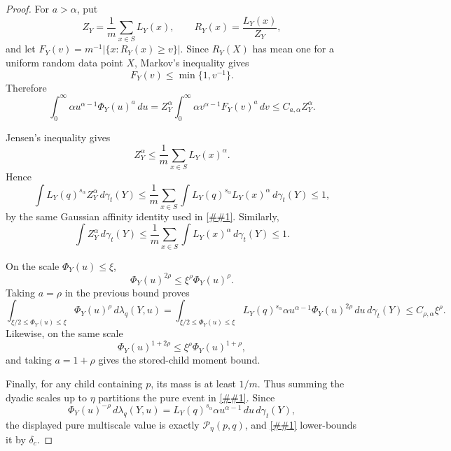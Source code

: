 \documentclass[10pt]{article}
\newcommand{\cref}[1]{\ref{##1}}
\theoremstyle{definition}
\begin{document}
\begin{proof}
   For $a>\alpha$, put
   \[
      Z_Y=\frac1m\sum_{x\in S}L_Y(x),
      \qquad
      R_Y(x)=\frac{L_Y(x)}{Z_Y},
   \]
   and let $F_Y(v)=m^{-1}|\{x:R_Y(x)\ge v\}|$. Since $R_Y(X)$ has mean one for a uniform random data point $X$, Markov's inequality gives
   \[
      F_Y(v)\le\min\{1,v^{-1}\}.
   \]
   Therefore
   \[
      \int_0^\infty \alpha u^{\alpha-1}\Phi_Y(u)^a\,du
      =
      Z_Y^\alpha
      \int_0^\infty \alpha v^{\alpha-1}F_Y(v)^a\,dv
      \le
      C_{a,\alpha}Z_Y^\alpha.
   \]

   Jensen's inequality gives
   \[
      Z_Y^\alpha\le\frac1m\sum_{x\in S}L_Y(x)^\alpha.
   \]
   Hence
   \[
      \int L_Y(q)^{s_\alpha}Z_Y^\alpha\,d\gamma_t(Y)
      \le
      \frac1m\sum_{x\in S}
      \int L_Y(q)^{s_\alpha}L_Y(x)^\alpha\,d\gamma_t(Y)
      \le1,
   \]
   by the same Gaussian affinity identity used in \cref{thm:continuous-likelihood-balls}. Similarly,
   \[
      \int Z_Y^\alpha\,d\gamma_t(Y)
      \le
      \frac1m\sum_{x\in S}\int L_Y(x)^\alpha\,d\gamma_t(Y)
      \le1.
   \]

   On the scale $\Phi_Y(u)\le\xi$,
   \[
      \Phi_Y(u)^{2\rho}\le\xi^\rho\Phi_Y(u)^\rho.
   \]
   Taking $a=\rho$ in the previous bound proves
   \[
      \int_{\xi/2\le\Phi_Y(u)\le\xi}
      \Phi_Y(u)^\rho\,d\lambda_q(Y,u)
      =
      \int_{\xi/2\le\Phi_Y(u)\le\xi}
      L_Y(q)^{s_\alpha}\alpha u^{\alpha-1}\Phi_Y(u)^{2\rho}\,du\,d\gamma_t(Y)
      \le
      C_{\rho,\alpha}\xi^\rho .
   \]
   Likewise, on the same scale
   \[
      \Phi_Y(u)^{1+2\rho}\le\xi^\rho\Phi_Y(u)^{1+\rho},
   \]
   and taking $a=1+\rho$ gives the stored-child moment bound.

   Finally, for any child containing $p$, its mass is at least $1/m$. Thus summing the dyadic scales up to $\eta$ partitions the pure event in \cref{thm:continuous-likelihood-balls}. Since
   \[
      \Phi_Y(u)^{-\rho}\,d\lambda_q(Y,u)
      =
      L_Y(q)^{s_\alpha}\alpha u^{\alpha-1}\,du\,d\gamma_t(Y),
   \]
   the displayed pure multiscale value is exactly $\mathcal P_\eta(p,q)$, and \cref{thm:continuous-likelihood-balls} lower-bounds it by $\delta_c$.
\end{proof}
\end{document}
